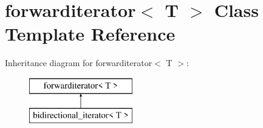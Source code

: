\hypertarget{classforwarditerator}{}\section{forwarditerator$<$ T $>$ Class Template Reference}
\label{classforwarditerator}
Inheritance diagram for forwarditerator$<$ T $>$\+:\begin{figure}[H]
\begin{center}
\leavevmode
\includegraphics[height=2.000000cm]{classforwarditerator}
\end{center}
\end{figure}
